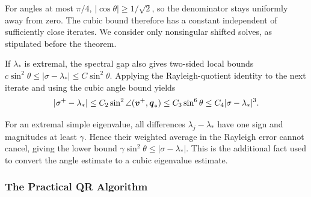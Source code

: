\documentclass[../main.tex]{subfiles}
\begin{document}
{For angles at most $\pi/4$, $|\cos\theta|\geq1/\sqrt2$, so the denominator stays uniformly away from zero. The cubic bound therefore has a constant independent of sufficiently close iterates. We consider only nonsingular shifted solves, as stipulated before the theorem.

If $\lambda_*$ is extremal, the spectral gap also gives two-sided local bounds $c\sin^2\theta\leq|\sigma-\lambda_*|\leq C\sin^2\theta$. Applying the Rayleigh-quotient identity to the next iterate and using the cubic angle bound yields
\begin{align*}
    |\sigma^+-\lambda_*|
    \leq C_2\sin^2\angle(\boldsymbol{v}^+,\boldsymbol{q}_*)
    \leq C_3\sin^6\theta
    \leq C_4|\sigma-\lambda_*|^3.
\end{align*}


For an extremal simple eigenvalue, all differences $\lambda_j-\lambda_*$ have one sign and magnitudes at least $\gamma$. Hence their weighted average in the Rayleigh error cannot cancel, giving the lower bound $\gamma\sin^2\theta\leq|\sigma-\lambda_*|$. This is the additional fact used to convert the angle estimate to a cubic eigenvalue estimate.
}

\subsubsection{The Practical QR Algorithm}

\label{def:qr-iteration}

\label{lem:hessenberg-qr-invariance}
\end{document}
